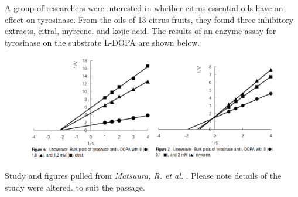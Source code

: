 \documentclass{article}
\begin{document}
A group of researchers were interested in whether citrus essential oils have an effect on tyrosinase. From the oils of 13 citrus fruits, they found three inhibitory extracts, citral, myrcene, and kojic acid. The results of an enzyme assay for tyrosinase on the substrate L-DOPA are shown below.

\begin{figure}[H]
\centering
\includegraphics[width=\textwidth]{fig.png}
\end{figure}

\vfill

\footnotesize{Study and figures pulled from \textit{Matsuura, R. et al.} \cite{pmid16536612}. Please note details of the study were altered. to suit the passage.}
\end{document}
